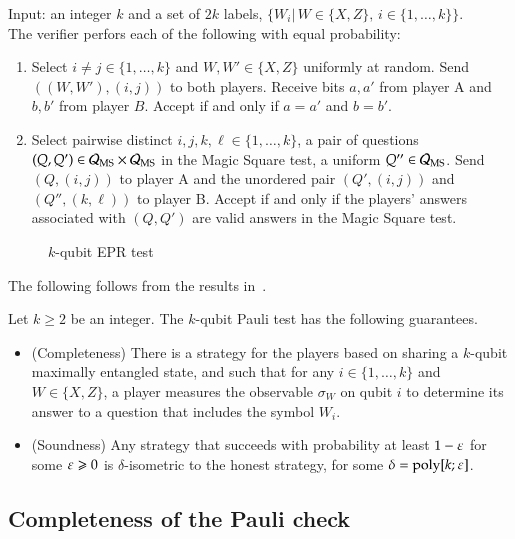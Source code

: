 \vspace{10pt}
\begin{center}
\begin{mdframed}
    Input: an integer $k$ and a set of $2k$ labels, $\{W_i|\, W\in\{X,Z\},\,i\in\{1,\ldots,k\}\}$.\\
		The verifier perfors each of the following with equal probability:
		\begin{enumerate}
		\item Select $i\neq j\in\{1,\ldots,k\}$ and $W,W'\in\{X,Z\}$ uniformly at random. Send $((W,W'),(i,j))$ to both players. Receive bits $a,a'$ from player A and $b,b'$ from player $B$. Accept if and only if $a=a'$ and $b=b'$.
		\item Select pairwise distinct $i,j,k,\ell\in\{1,\ldots,k\}$, a pair of questions $(Q,Q') \in \mathcal{Q}_{\textsc{MS}}\times\mathcal{Q}_{\textsc{MS}}$ in the Magic Square test, a uniform $Q''\in\mathcal{Q}_{\textsc{MS}}$. Send $(Q,(i,j))$ to player A and the unordered pair $(Q',(i,j))$ and $(Q'',(k,\ell))$ to player B. Accept if and only if the players' answers associated with $(Q,Q')$ are valid answers in the Magic Square test. 
   \end{enumerate}    
\end{mdframed}
\end{center}
\begin{figure}[H]
\caption{$k$-qubit EPR test~\cite{reichardt}}
\label{fig:epr_test}
\end{figure}

The following follows from the results in~\cite{reichardt}. 

\begin{theorem}\label{thm:epr-test}
Let $k \geq 2$ be an integer. The $k$-qubit Pauli test has the following guarantees. 
\begin{itemize}
\item (Completeness) There is a strategy for the players based on sharing a $k$-qubit maximally entangled state, and such that for any $i\in\{1,\ldots,k\}$ and $W\in\{X,Z\}$, a player measures the observable $\sigma_W$ on qubit $i$ to determine its answer to a question that includes the symbol $W_i$. 
\item (Soundness) Any strategy that succeeds with probability at least $1-\varepsilon$ for some $\varepsilon\geqslant 0$ is $\delta$-isometric to the honest strategy, for some $\delta = \operatorname{poly}[k;\varepsilon]$. 
\end{itemize}
\end{theorem}

\subsection{Completeness of the Pauli check}

